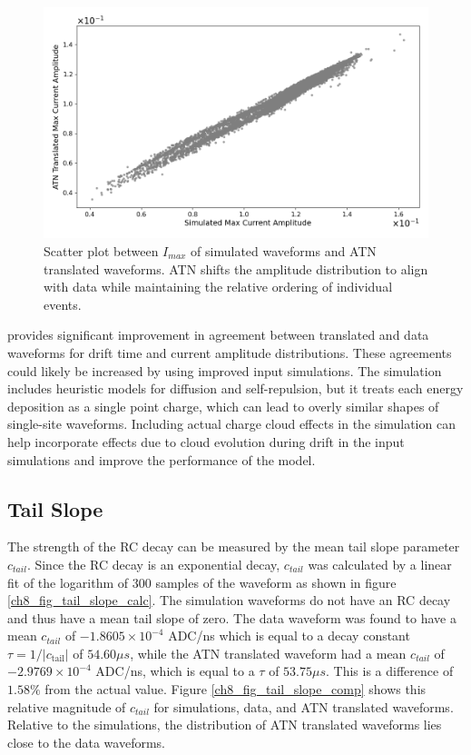 \begin{figure}%
\centering
\includegraphics[width=0.9\linewidth,trim={0pc 0pc 0pc 0pc},clip]{ch8/figs/SEP_scatter_current_amplitude.png}
\caption{Scatter plot between $I_{max}$ of simulated waveforms and ATN translated waveforms. ATN shifts the amplitude distribution to align with data while maintaining the relative ordering of individual events.}
\label{fig:current_amp}
\end{figure}

{\cpunet} provides significant improvement in agreement between translated and data waveforms for drift time and current amplitude distributions. These agreements could likely be increased by using improved input simulations. The {\siggen} simulation includes heuristic models for diffusion and self-repulsion, but it treats each energy deposition as a single point charge, which can lead to overly similar shapes of single-site waveforms. Including actual charge cloud effects in the simulation can help incorporate effects due to cloud evolution during drift in the input simulations and improve the performance of the model.

\subsection{Tail Slope}
The strength of the RC decay can be measured by the mean tail slope parameter $c_{tail}$. Since the RC decay is an exponential decay, $c_{tail}$ was calculated by a linear fit of the logarithm of 300 samples of the waveform as shown in figure \ref{ch8_fig_tail_slope_calc}. The simulation waveforms do not have an RC decay and thus have a mean tail slope of zero. The data waveform was found to have a mean $c_{tail}$ of $-1.8605\times10^{-4}$ ADC/ns which is equal to a decay constant $\tau = 1/|c_{\mathrm{tail}}|$
 of $54.60 \mu s$, while the ATN translated waveform had a mean $c_{tail}$ of $-2.9769\times10^{-4}$ ADC/ns, which is equal to a $\tau$ of $53.75 \mu s$. This is a difference of $1.58\%$ from the actual value. Figure \ref{ch8_fig_tail_slope_comp} shows this relative magnitude of $c_{tail}$ for simulations, data, and ATN translated waveforms. Relative to the simulations, the distribution of ATN translated waveforms lies close to the data waveforms.

